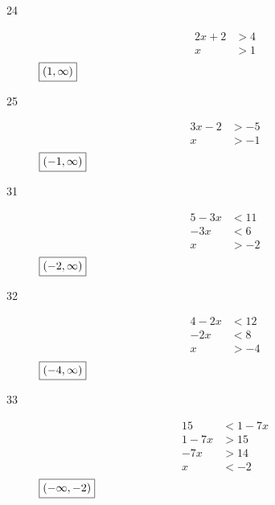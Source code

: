 \documentclass[letterpaper, landscape]{exam}
\begin{document}
\begin{description}
      \newpage

      \item[24] 
        \begin{align*}
          2x + 2 & > 4 \\
          x      & > 1 \\
        \end{align*}
        $\boxed{ \intoo{ 1, \infty } }$

      \item[25] 
        \begin{align*}
          3x - 2 & > -5 \\
          x      & > -1 \\
        \end{align*}
        $\boxed{ \intoo{ -1, \infty } }$


      \item[31]
        \begin{align*}
          5 - 3x & < 11 \\
          -3x    & < 6 \\
          x      & > -2 \\
        \end{align*}
        $\boxed{ \intoo{ -2, \infty } }$

      \item[32]
        \begin{align*}
          4 - 2x & < 12 \\
          -2x    & < 8 \\
          x      & > -4 \\
        \end{align*}
        $\boxed{ \intoo{ -4, \infty } }$ 

      \item[33]
        \begin{align*}
          15     & < 1 - 7x \\
          1 - 7x & > 15 \\
          -7x    & > 14 \\
          x      & < -2 \\
        \end{align*}
        $\boxed{ \intoo{ -\infty, -2 } }$


\end{description}
\end{document}
